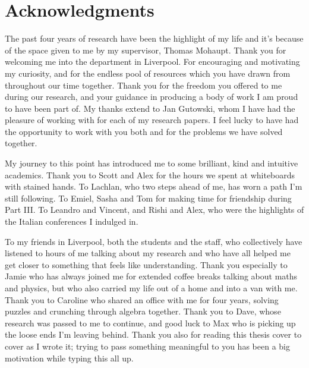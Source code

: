 \chapter*{Acknowledgments}

The past four years of research have been the highlight of my life and it's because of the space given to me by my supervisor, Thomas Mohaupt. Thank you for welcoming me into the department in Liverpool. For encouraging and motivating my curiosity, and for the endless pool of resources which you have drawn from throughout our time together. Thank you for the freedom you offered to me during our research, and your guidance in producing a body of work I am proud to have been part of. My thanks extend to Jan Gutowski, whom I have had the pleasure of working with for each of my research papers. I feel lucky to have had the opportunity to work with you both and for the problems we have solved together.

My journey to this point has introduced me to some brilliant, kind and intuitive academics. Thank you to Scott and Alex for the hours we spent at whiteboards with stained hands. To Lachlan, who two steps ahead of me, has worn a path I'm still following. To Emiel, Sasha and Tom for making time for friendship during Part III. To Leandro and Vincent, and Rishi and Alex, who were the highlights of the Italian conferences I indulged in.

To my friends in Liverpool, both the students and the staff, who collectively have listened to hours of me talking about my research and who have all helped me get closer to something that feels like understanding. Thank you especially to Jamie who has always joined me for extended coffee breaks talking about maths and physics, but who also carried my life out of a home and into a van with me. Thank you to Caroline who shared an office with me for four years, solving puzzles and crunching through algebra together. Thank you to Dave, whose research was passed to me to continue, and good luck to Max who is picking up the loose ends I'm leaving behind. Thank you also for reading this thesis cover to cover as I wrote it; trying to pass something meaningful to you has been a big motivation while typing this all up. 

